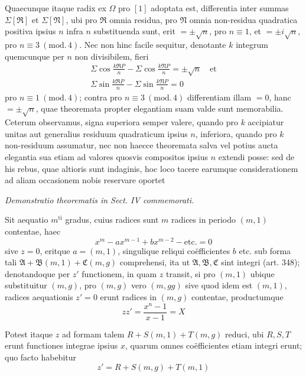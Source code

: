 Quaecunque itaque radix ex \(\Omega\) pro \([1]\) adoptata est, differentia inter summas \(\Sigma[\mathfrak R]\) et \(\Sigma[\mathfrak N]\), ubi pro \(\mathfrak R\) omnia residua, pro \(\mathfrak N\) omnia non-residua quadratica positiva ipsius \(n\) infra \(n\) substituenda sunt, erit \(=\pm\surd n\), pro \(n\equiv1\), et \(=\pm i\surd n\), pro \(n\equiv3\ (\mathrm{mod.}\,4)\). Nec non hinc facile sequitur, denotante \(k\) integrum quemcunque per \(n\) non divisibilem, fieri \[\begin{gathered}\Sigma\cos\frac{k\mathfrak RP}{n}-\Sigma\cos\frac{k\mathfrak NP}{n}=\pm\surd n\quad\text{et}\\\Sigma\sin\frac{k\mathfrak RP}{n}-\Sigma\sin\frac{k\mathfrak NP}{n}=0\end{gathered}\] pro \(n\equiv1\ (\mathrm{mod.}\,4)\); contra pro \(n\equiv3\ (\mathrm{mod.}\,4)\) differentiam illam \(=0\), hanc
\(=\pm\surd n\), quae theoremata propter elegantiam suam valde sunt memorabilia. Ceterum observamus, signa superiora semper valere, quando pro \(k\) accipiatur unitas aut generalius residuum quadraticum ipsius \(n\), inferiora, quando pro \(k\) non-residuum assumatur, nec non haecce theoremata salva vel potius aucta elegantia sua etiam ad valores quosvis compositos ipsius \(n\) extendi posse: sed de his rebus, quae altioris sunt indaginis, hoc loco tacere earumque considerationem ad aliam occasionem nobis reservare oportet

\begin{center}\itshape \textit{Demonstratio theorematis in Sect. IV commemorati.}\end{center}


Sit aequatio \(m^{\mathrm{ti}}\) gradus, cuius radices sunt \(m\) radices in periodo \((m,1)\) contentae, haec \[x^m-ax^{m-1}+bx^{m-2}-\text{etc.}=0\] sive \(z=0\), eritque \(a=(m,1)\), singulique reliqui coëfficientes \(b\) etc. sub forma tali \(\mathfrak A+\mathfrak B(m,1)+\mathfrak C(m,g)\) comprehensi, ita ut \(\mathfrak A,\allowbreak \mathfrak B,\allowbreak \mathfrak C\) sint integri (art. 348); denotandoque per \(z'\) functionem, in quam \(z\) transit, si pro \((m,1)\) ubique substituitur \((m,g)\), pro \((m,g)\) vero \((m,gg)\) sive quod idem est \((m,1)\), radices aequationis \(z'=0\) erunt radices in \((m,g)\) contentae, productumque \[zz'=\frac{x^n-1}{x-1}=X\]

Potest itaque \(z\) ad formam talem \(R+S(m,1)+T(m,g)\) reduci, ubi \(R,\allowbreak S,\allowbreak T\) erunt functiones integrae ipsius \(x\), quarum omnes coëfficientes etiam integri erunt; quo facto habebitur \[z'=R+S(m,g)+T(m,1)\]


